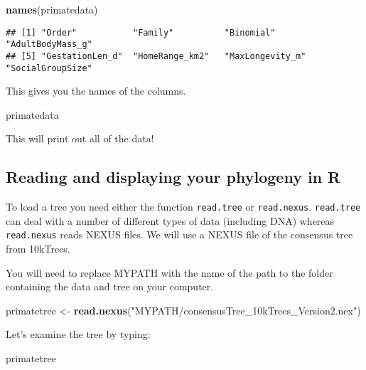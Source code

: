 \documentclass[11pt]{article}
\newcommand{\KeywordTok}[1]{\textcolor[rgb]{0.13,0.29,0.53}{\textbf{{#1}}}}
\newcommand{\StringTok}[1]{\textcolor[rgb]{0.31,0.60,0.02}{{#1}}}
\newcommand{\NormalTok}[1]{{#1}}
\begin{document}
\begin{snugshade}
\begin{Highlighting}[]
\KeywordTok{names}\NormalTok{(primatedata)}
\end{Highlighting}
\end{snugshade}

\begin{verbatim}
## [1] "Order"           "Family"          "Binomial"        "AdultBodyMass_g"
## [5] "GestationLen_d"  "HomeRange_km2"   "MaxLongevity_m"  "SocialGroupSize"
\end{verbatim}

This gives you the names of the columns.

\begin{snugshade}
\begin{Highlighting}[]
\NormalTok{primatedata}
\end{Highlighting}
\end{snugshade}

This will print out all of the data!

\subsection{Reading and displaying your phylogeny in R}
\label{tree}
To load a tree you need either the function \texttt{read.tree} or \texttt{read.nexus}.
\texttt{read.tree} can deal with a number of different types of data (including
DNA) whereas \texttt{read.nexus} reads NEXUS files. We will use a NEXUS file of
the consensus tree from 10kTrees.

\begin{framed}
You will need to replace MYPATH with the name of the path to the folder containing the data and tree on your computer.
\end{framed}

\begin{snugshade}
\begin{Highlighting}[]
\NormalTok{primatetree <-}\StringTok{ }\KeywordTok{read.nexus}\NormalTok{(}\StringTok{"MYPATH/consensusTree_10kTrees_Version2.nex"}\NormalTok{)}
\end{Highlighting}
\end{snugshade}

Let's examine the tree by typing:

\begin{snugshade}
\begin{Highlighting}[]
\NormalTok{primatetree}
\end{Highlighting}
\end{snugshade}
\end{document}
